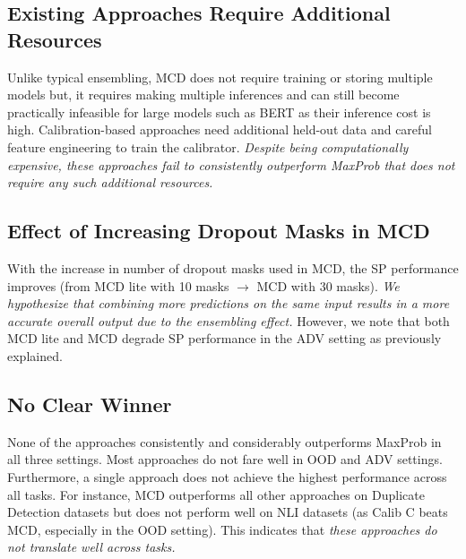 \documentclass[11pt]{article}
\begin{document}
\subsection{Existing Approaches Require Additional Resources}
Unlike typical ensembling, MCD does not require training or storing multiple models but, it requires making multiple inferences and can still become practically infeasible for large models such as BERT as their inference cost is high.
Calibration-based approaches need additional held-out data and careful feature engineering to train the calibrator.
\textit{Despite being computationally expensive, these approaches fail to consistently outperform MaxProb that does not require any such additional resources.}


\subsection{Effect of Increasing Dropout Masks in MCD}
With the increase in number of dropout masks used in MCD, the SP performance improves (from MCD lite with 10 masks $\rightarrow$ MCD with 30 masks).  
\textit{We hypothesize that combining more predictions on the same input results in a more accurate overall output due to the ensembling effect.}
However, we note that both MCD lite and MCD degrade SP performance in the ADV setting as previously explained.

\subsection{No Clear Winner}
None of the approaches consistently and considerably outperforms MaxProb in all three settings.
Most approaches do not fare well in OOD and ADV settings. 
Furthermore, a single approach does not achieve the highest performance across all tasks.
For instance, MCD outperforms all other approaches on Duplicate Detection datasets but does not perform well on NLI datasets (as Calib C beats MCD, especially in the OOD setting).
This indicates that \textit{these approaches do not translate well across tasks.}
\end{document}
